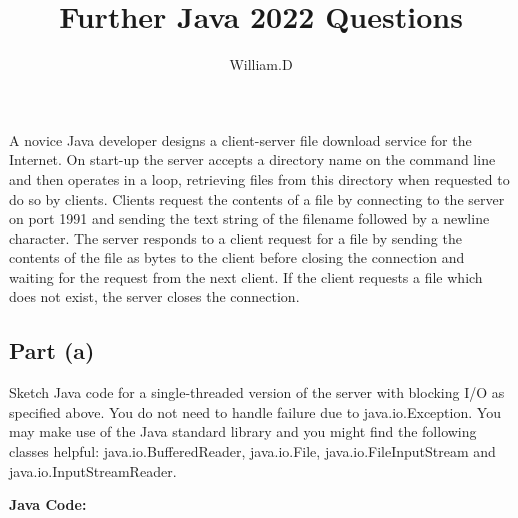 \documentclass[12pt]{article}
\title{Further Java 2022 Questions}
\begin{document}
\author{William.D}

\maketitle

A novice Java developer designs a client-server file download service for the Internet.
On start-up the server accepts a directory name on the command line and then
operates in a loop, retrieving files from this directory when requested to do so by
clients. Clients request the contents of a file by connecting to the server on port 1991
and sending the text string of the filename followed by a newline character. The
server responds to a client request for a file by sending the contents of the file as
bytes to the client before closing the connection and waiting for the request from the
next client. If the client requests a file which does not exist, the server closes the connection.



\subsection*{Part (a)} Sketch Java code for a single-threaded version of the server with blocking
I/O as specified above. You do not need to handle failure due to
java.io.Exception. You may make use of the Java standard library
and you might find the following classes helpful: java.io.BufferedReader,
java.io.File, java.io.FileInputStream and java.io.InputStreamReader.

\vspace{0.1in} %

\textbf{Java Code:}
\end{document}
